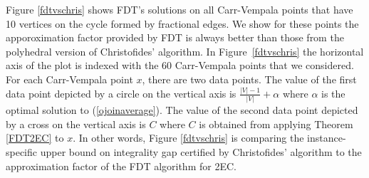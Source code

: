 
Figure \ref{fdtvschris} shows FDT's solutions on all Carr-Vempala points that have 10 vertices on the cycle formed by fractional edges. We show for these points the apporoximation factor provided by FDT is always better than those from the polyhedral version of Christofides' algorithm. In Figure~\ref{fdtvschris} the horizontal axis of the plot is indexed with the 60 Carr-Vempala points that we considered. For each Carr-Vempala point $x$, there are two data points. The value of the first data point depicted by a circle on the vertical axis is $\frac{|V|-1}{|V|}+\alpha$  where $\alpha$ is the optimal solution to (\ref{ojoinaverage}).
The value of the second data point depicted by a cross on the vertical axis is $C$ where $C$ is obtained from applying Theorem \ref{FDT2EC} to $x$. In other words, Figure \ref{fdtvschris} is comparing the instance-specific upper bound on integrality gap certified by Christofides' algorithm to the approximation factor of the FDT algorithm for 2EC.

